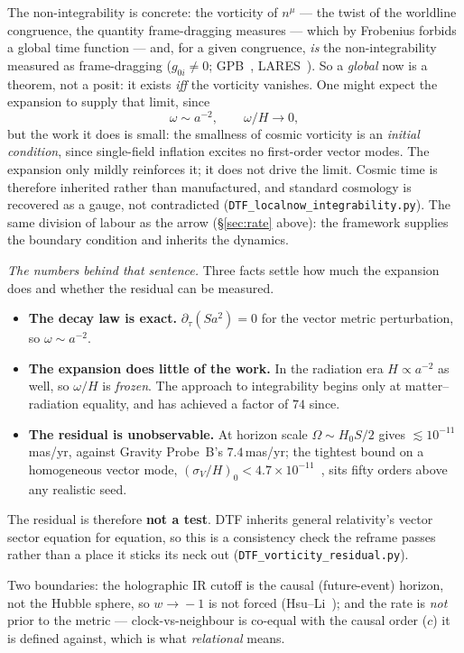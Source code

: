 \documentclass[11pt]{article}
\begin{document}
The non-integrability is concrete: the vorticity of $n^\mu$ --- the twist of the worldline congruence,
the quantity frame-dragging measures --- which by Frobenius forbids a global time function
--- and, for a given congruence, \emph{is} the non-integrability measured as frame-dragging ($g_{0i}\neq0$;
GPB~\cite{GravityProbeB2011}, LARES~\cite{LARES2016}). So a \emph{global} now is a theorem, not a posit: it
exists \emph{iff} the vorticity vanishes. One might expect the expansion to supply that limit, since
\[ \omega\sim a^{-2}, \qquad \omega/H\to0 , \]
but the work it does is small: the smallness of cosmic vorticity is an \emph{initial condition}, since single-field inflation excites no first-order vector modes. The expansion only mildly reinforces it; it does not drive the limit. Cosmic time is therefore inherited rather than manufactured, and standard cosmology is recovered as a
gauge, not contradicted (\texttt{DTF\_localnow\_integrability.py}). The same division of labour as the arrow
(\S\ref{sec:rate} above): the framework supplies the boundary condition and inherits the dynamics.

\emph{The numbers behind that sentence.} Three facts settle how much the expansion does and whether the
residual can be measured.
\begin{itemize}[leftmargin=1.4em,itemsep=2pt,topsep=3pt]
\item \textbf{The decay law is exact.} $\partial_\tau(Sa^2)=0$ for the vector metric perturbation, so
  $\omega\sim a^{-2}$.
\item \textbf{The expansion does little of the work.} In the radiation era $H\propto a^{-2}$ as well, so
  $\omega/H$ is \emph{frozen}. The approach to integrability begins only at matter--radiation equality, and
  has achieved a factor of $74$ since.
\item \textbf{The residual is unobservable.} At horizon scale $\Omega\sim H_0S/2$ gives
  $\lesssim10^{-11}$\,mas/yr, against Gravity Probe~B's $7.4$\,mas/yr; the tightest bound on a homogeneous
  vector mode, $(\sigma_V/H)_0<4.7\times10^{-11}$~\cite{Saadeh2016}, sits fifty orders above any realistic
  seed.
\end{itemize}
\noindent The residual is therefore \textbf{not a test}. DTF inherits general relativity's vector sector
equation for equation, so this is a consistency check the reframe passes rather than a place it sticks its
neck out (\texttt{DTF\_vorticity\_residual.py}).

Two boundaries: the holographic IR cutoff is the causal (future-event) horizon, not the Hubble sphere, so
$w\!\to\!-1$ is not forced (Hsu--Li~\cite{Hsu2004,Li2004}); and the rate is \emph{not} prior to the metric ---
clock-vs-neighbour is co-equal with the causal order ($c$) it is defined against, which is what
\emph{relational} means.
\end{document}
